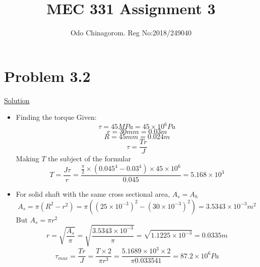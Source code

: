 \documentclass{article}
\title{MEC 331 Assignment 3}
\author{Odo Chinagorom. Reg  No:2018/249040 }
\begin{document}
\maketitle
\newpage

\section*{Problem 3.2}
\begin{center}\underline{Solution}\end{center}
\begin{itemize}
\item Finding the torque \newline
 Given: \[\tau =45MPa= 45 \times 10^{6}Pa\]\[r= 30mm = 0.03m\]\[R = 45mm = 0.024m\]
\[\tau = \frac{{T}{r}}{J}\]
Making $ T$ the subject of the formular
\[T = \frac{J\tau}{r} = \frac{{\frac{\pi}{2}}\times(0.045^{4} - 0.03^{4})\times 45 \times 10^{6}}{0.045} = 5.168\times 10^{3}\]
\item For solid shaft with the same cross sectional area, $A_{s} = A_{h}$
\[A_{s} = \pi(R^{2}-r^{2}) =  \pi((25\times10^{-3})^{2}-(30\times10^{-3})^{2}) = 3.5343\times10^{-3}m^{2}\]
But $A_{s} = \pi r^{2}$
\[r = \sqrt{\frac{A_{s}}{\pi}} = \sqrt{\frac{3.5343\times10^{-3}}{\pi}} = \sqrt{1.1225\times10^{-3}} = 0.0335m\]
\[\tau_{max} = \frac{{T}{r}}{J} = \frac{{T}\times{2}}{{\pi}{r^{3}}} = \frac{{5.1689\times 10^{3}}\times{2}}{{\pi}{0.033541}} = {87.2\times10^{6}Pa}\]
\end{itemize}

\end{document}
